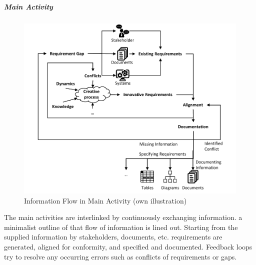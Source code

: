 \subparagraph{Main Activity}
\begin{figure}[H]
    \centering
    \includegraphics[scale=1]{img/MainActivity.pdf}
    \caption[Information Flow in Main Activity of Requirements Engineering]{Information Flow in Main Activity  (own illustration)}
    \label{fig:infFlow}
\end{figure}
The main activities are interlinked by continuously exchanging information.  a minimalist outline of that flow of information is lined out. Starting from the supplied information by stakeholders, documents, etc. requirements are generated, aligned for conformity, and specified and documented. Feedback loops try to resolve any occurring errors such as conflicts of requirements or gaps.
